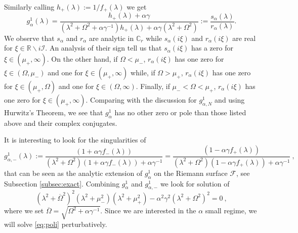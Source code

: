 \documentclass[11pt]{article}
\numberwithin{equation}{section}
\numberwithin{theorem}{section}
\begin{document}
Similarly calling $h_+(\lambda):=1/f_+(\lambda)$ we get
\[
 g^1_\alpha(\lambda)=\frac{h_+(\lambda)+\alpha\gamma}{(\lambda^2+\Omega^2+\alpha\gamma^{-1})
h_+(\lambda)+\alpha\gamma(\lambda^2+\Omega^2)}:=\frac{s_\alpha(\lambda)}{r_\alpha(\lambda)}.
\]
We observe that $s_\alpha$ and $r_\alpha$ are analytic in $\mathds C_r$ while $s_\alpha(i\xi)$ and $r_\alpha(i\xi)$ are
real for $\xi\in\mathds R\backslash i\mathcal I$. An analysis of their sign tell us that $s_\alpha(i\xi)$ has a zero for
$\xi\in(\mu_+,\infty)$. On the other hand, if $\Omega<\mu_-$, $r_\alpha(i\xi)$ has one zero for $\xi\in(\Omega,\mu_-)$
and one for $\xi\in(\mu_+,\infty)$ while, if $\Omega> \mu_+$, $r_\alpha(i\xi)$ has one zero for $\xi\in(\mu_+,\Omega)$
and one for $\xi\in(\Omega,\infty)$. Finally, if $\mu_-<\Omega<\mu_+$, $r_\alpha(i\xi)$ has one zero for
$\xi\in(\mu_+,\infty)$. Comparing with the discussion for $g^1_{\alpha,N}$ and using Hurwitz's Theorem, we see that
$g^1_\alpha$ has no other zero or pole than those listed above and their complex conjugates.

It is interesting to look for the singularities of
\begin{equation}\label{eq:g-}
g^1_{\alpha,-}(\lambda):=\frac{(1+\alpha\gamma
  f_-(\lambda))}{\left(\lambda^2+\Omega^2\right)\left(1+\alpha\gamma
f_-(\lambda)\right) + \alpha\gamma^{-1}}=\frac{(1-\alpha\gamma
  f_+(\lambda))}{\left(\lambda^2+\Omega^2\right)\left(1-\alpha\gamma
f_+(\lambda)\right) + \alpha\gamma^{-1}}\ ,
\end{equation}
that can be seen as the analytic extension of $g^1_\alpha$ on the Riemann surface $\mathcal F$, see Subsection
\ref{subsec:exact}. Combining $g^1_\alpha$ and $g^1_{\alpha,-}$ we look for solution of
\begin{equation}\label{eq:poli}
\left(\lambda^2+\overline\Omega^2\right)^2(\lambda^2+\mu_-^2)(\lambda^2+\mu_+^
2)
-\alpha^2\gamma^2(\lambda^2+\Omega^2)^2=0\ ,
\end{equation}
where we set $\overline \Omega=\sqrt{\Omega^2+\alpha\gamma^{-1}}$. Since we are interested in the $\alpha$ small regime,
we will solve \eqref{eq:poli} perturbatively.
\end{document}
